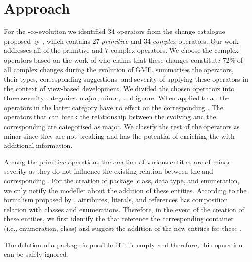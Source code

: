 \section{Approach} \label{sec:Approach}
For the \metamodel-\viewtype co-evolution we identified 34 operators from the change catalogue proposed by \cite{herrmannsdoerfer_extensive_2011}, which contains 27 \textit{primitive} and 34 \textit{complex} operators. Our work addresses all of the primitive and 7 complex operators. We choose the complex operators based on the work of \cite{khelladi_detecting_2015} who claims that these changes constitute 72\% of all complex changes during the evolution of GMF.  summarises the operators, their types, corresponding suggestions, and severity of applying these operators in the context of view-based development. We divided the chosen operators into three severity categories: major, minor, and ignore. When applied to a \metamodel, the operators in the latter category have no effect on the corresponding \viewtypes. The operators that can break the relationship between the evolving \metamodel and the corresponding \viewtypes are categorised as major. We classify the rest of the operators as minor since they are not breaking and has the potential of enriching the \viewtypes with additional information.

Among the primitive operations the creation of various entities are of minor severity as they do not influence the existing relation between the \metamodel and corresponding \viewtypes. For the creation of package, class, data type, and enumeration, we only notify the modeller about the addition of these entities. According to the \metamodeling formalism proposed by \cite{herrmannsdoerfer_extensive_2011}, attributes, literals, and references has composition relation with classes and enumerations. Therefore, in the event of the creation of these entities, we first identify the \viewtypes that reference the corresponding container (i.e., enumeration, class) and suggest the addition of the new entities for these \viewtypes.

The deletion of a package is possible iff it is empty and therefore, this operation can be safely ignored. 

